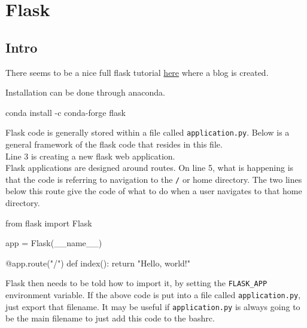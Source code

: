\documentclass[]{book}
\newenvironment{Shaded}{\begin{snugshade}}{\end{snugshade}}
\newcommand{\BuiltInTok}[1]{#1}
\newcommand{\ExtensionTok}[1]{#1}
\newcommand{\NormalTok}[1]{#1}
\newcommand{\StringTok}[1]{\textcolor[rgb]{0.31,0.60,0.02}{#1}}
\begin{document}
\hypertarget{flask}{%
\chapter{Flask}\label{flask}}

\hypertarget{intro-1}{%
\section{Intro}\label{intro-1}}

There seems to be a nice full flask tutorial \href{https://blog.miguelgrinberg.com/post/the-flask-mega-tutorial-part-i-hello-world}{here} where a blog is created.

Installation can be done through anaconda.

\begin{Shaded}
\begin{Highlighting}[]
\ExtensionTok{conda}\NormalTok{ install -c conda-forge flask}
\end{Highlighting}
\end{Shaded}

Flask code is generally stored within a file called \texttt{application.py}. Below is a general framework of the flask code that resides in this file.\\
Line 3 is creating a new flask web application.\\
Flask applications are designed around routes. On line 5, what is happening is that the code is referring to navigation to the \texttt{/} or home directory. The two lines below this route give the code of what to do when a user navigates to that home directory.

\begin{Shaded}
\begin{Highlighting}[]
\ExtensionTok{from}\NormalTok{ flask import Flask   }
                          
\ExtensionTok{app}\NormalTok{ = Flask(__name__)     }
                          
\ExtensionTok{@app.route}\NormalTok{(}\StringTok{"/"}\NormalTok{)           }
\ExtensionTok{def}\NormalTok{ index()}\BuiltInTok{:}              
    \BuiltInTok{return} \StringTok{"Hello, world!"}
\end{Highlighting}
\end{Shaded}

Flask then needs to be told how to import it, by setting the \texttt{FLASK\_APP} environment variable. If the above code is put into a file called \texttt{application.py}, just export that filename. It may be useful if \texttt{application.py} is always going to be the main filename to just add this code to the bashrc.
\end{document}
